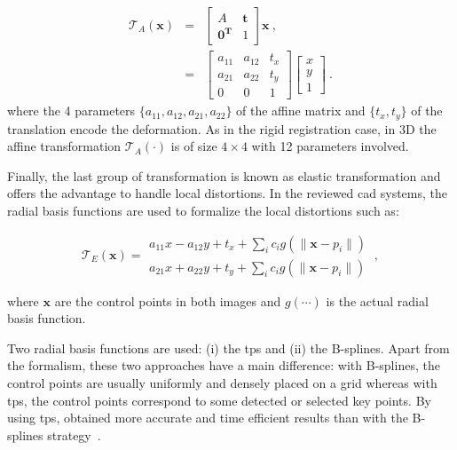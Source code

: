 \begin{eqnarray}
	\mathcal{T}_A(\mathbf{x}) & = & \begin{bmatrix}
		A & \mathbf{t} \\
		\mathbf{0^T} & 1
	\end{bmatrix} \mathbf{x} \ , \nonumber \\
	& = & \begin{bmatrix}
		a_{11} & a_{12} & t_x \\
		a_{21} & a_{22} & t_y \\
		0 & 0 & 1
	\end{bmatrix}\begin{bmatrix}
		x \\
		y \\
		1
	\end{bmatrix} \ . \label{eq:afftra}%
\end{eqnarray}
\noindent where the 4 parameters $\{a_{11},a_{12},a_{21},a_{22}\}$ of the affine matrix and $\{ t_x, t_y \}$ of the translation encode the deformation.
As in the rigid registration case, in 3D the affine transformation $\mathcal{T}_A(\cdot)$ is of size $4 \times 4$ with 12 parameters involved.

Finally, the last group of transformation is known as elastic transformation and offers the advantage to handle local distortions.
In the reviewed \ac{cad} systems, the radial basis functions are used to formalize the local distortions such as:

\begin{equation}
	\mathcal{T}_E(\mathbf{x}) = \begin{matrix}
	a_{11} x - a_{12} y + t_x + \sum_i c_i g(\| \mathbf{x} - p_i \|) \\
	a_{21} x + a_{22} y + t_y + \sum_i c_i g(\| \mathbf{x} - p_i \|)
	\end{matrix} \ ,
\end{equation}

\noindent where $\mathbf{x}$ are the control points in both images and $g(\cdots)$ is the actual radial basis function. 

Two radial basis functions are used: (i) the \ac{tps} and (ii) the B-splines.
Apart from the formalism, these two approaches have a main difference: with B-splines, the control points are usually uniformly and densely placed on a grid whereas with \ac{tps}, the control points correspond to some detected or selected key points.
By using \ac{tps}, \citeauthor{Mitra2011} obtained more accurate and time efficient results than with the B-splines strategy~\cite{Mitra2012a}.

